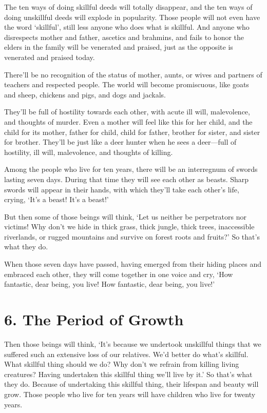 \documentclass[12pt,openany]{book}%
\begin{document}
The ten ways of doing skillful deeds will totally disappear, and the ten ways of doing unskillful deeds will explode in popularity. Those people will not even have the word ‘skillful’, still less anyone who does what is skillful. And anyone who disrespects mother and father, ascetics and brahmins, and fails to honor the elders in the family will be venerated and praised, just as the opposite is venerated and praised today. 

There’ll be no recognition of the status of mother, aunts, or wives and partners of teachers and respected people. The world will become promiscuous, like goats and sheep, chickens and pigs, and dogs and jackals. 

They’ll be full of hostility towards each other, with acute ill will, malevolence, and thoughts of murder. Even a mother will feel like this for her child, and the child for its mother, father for child, child for father, brother for sister, and sister for brother. They’ll be just like a deer hunter when he sees a deer—full of hostility, ill will, malevolence, and thoughts of killing. 

Among the people who live for ten years, there will be an interregnum of swords lasting seven days. During that time they will see each other as beasts. Sharp swords will appear in their hands, with which they’ll take each other’s life, crying, ‘It’s a beast! It’s a beast!’ 

But then some of those beings will think, ‘Let us neither be perpetrators nor victims! Why don’t we hide in thick grass, thick jungle, thick trees, inaccessible riverlands, or rugged mountains and survive on forest roots and fruits?’ So that’s what they do. 

When those seven days have passed, having emerged from their hiding places and embraced each other, they will come together in one voice and cry, ‘How fantastic, dear being, you live! How fantastic, dear being, you live!’ 

\section*{6. The Period of Growth }

Then those beings will think, ‘It’s because we undertook unskillful things that we suffered such an extensive loss of our relatives. We’d better do what’s skillful. What skillful thing should we do? Why don’t we refrain from killing living creatures? Having undertaken this skillful thing we’ll live by it.’ So that’s what they do. Because of undertaking this skillful thing, their lifespan and beauty will grow. Those people who live for ten years will have children who live for twenty years. 
\end{document}
